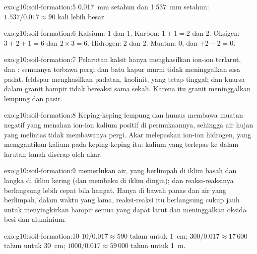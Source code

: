 \begin{solution}{exo:g10:soil-formation:5}
\qty{0.017}{mm} setahun dan \qty{1.537}{mm} setahun: $1.537/0.017 \approx 90$
kali lebih besar.
\end{solution}

\begin{solution}{exo:g10:soil-formation:6}
Kalsium: 1 dan 1. Karbon: $1 + 1 = 2$ dan 2. Oksigen: $3 + 2 + 1 = 6$ dan
$2 \times 3 = 6$. Hidrogen: 2 dan 2. Muatan: 0, dan $+2 - 2 = 0$.
\end{solution}

\begin{solution}{exo:g10:soil-formation:7}
Pelarutan kalsit hanya menghasilkan ion-ion terlarut,  dan
: semuanya terbawa pergi dan batu kapur murni tidak meninggalkan
sisa padat.  feldspar menghasilkan padatan, kaolinit, yang tetap
tinggal; dan kuarsa dalam granit hampir tidak bereaksi sama sekali. Karena
itu granit meninggalkan lempung dan pasir.
\end{solution}

\begin{solution}{exo:g10:soil-formation:8}
Keping-keping lempung dan humus membawa muatan negatif yang menahan ion-ion
kalium positif  di permukaannya, sehingga air hujan yang melintas tidak
membawanya pergi. Akar melepaskan ion-ion hidrogen, yang menggantikan kalium
pada keping-keping itu; kalium yang terlepas ke dalam larutan tanah diserap oleh
akar.
\end{solution}

\begin{solution}{exo:g10:soil-formation:9}
 memerlukan air, yang berlimpah di iklim basah dan langka di
iklim kering (dan membeku di iklim dingin); dan reaksi-reaksinya berlangsung
lebih cepat bila hangat. Hanya di bawah panas dan air yang berlimpah, dalam
waktu yang lama, reaksi-reaksi itu berlangsung cukup jauh untuk menyingkirkan
hampir semua yang dapat larut dan meninggalkan oksida besi dan aluminium.
\end{solution}

\begin{solution}{exo:g10:soil-formation:10}
$10/0.017 \approx 590$ tahun untuk \qty{1}{cm}; $300/0.017 \approx 17\,600$
tahun untuk \qty{30}{cm}; $1000/0.017 \approx 59\,000$ tahun untuk \qty{1}{m}.
\end{solution}


